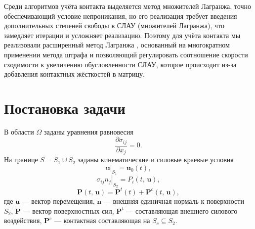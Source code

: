 \documentclass[]{article}
\begin{document}
Среди алгоритмов учёта контакта \cite{Burago2005} выделяется метод множителей Лагранжа, точно обеспечивающий условие непроникания, но его реализация требует введения дополнительных степеней свободы в СЛАУ (множителей Лагранжа), что замедляет итерации и усложняет реализацию. Поэтому для учёта контакта мы реализовали расширенный метод Лагранжа \cite{Wriggers2006}, основанный на многократном применении метода штрафа и позволяющий регулировать соотношение скорости сходимости к увеличению обусловленности СЛАУ, которое происходит из-за добавления контактных жёсткостей в матрицу.

\section{Постановка задачи}
В области $\Omega$ заданы уравнения равновесия \cite{Pisarenko1981}
\begin{equation}
\frac{\partial\sigma_{ij}}{\partial x_j} = 0.%
\label{F:F1}
\end{equation}
На границе $S=S_{1}\cup S_{2}$ заданы кинематические и силовые
краевые условия
\begin{equation}
\left.\mathbf{u}\right|_{S_{1}}=\mathbf{u}_{0}\left(t\right),
\label{F:F2}
\end{equation}
\begin{equation}
\left.\sigma_{ij}n_j\right|_{S_{2}}=P_{i}\left(t,\,\mathbf{u}\right),%
\label{F:F3}
\end{equation}
\begin{equation}
\mathbf{P}\left(t,\,\mathbf{u}\right)=\mathbf{P}^t\left(t\right)+\mathbf{P}^c\left(t,\,\mathbf{u}\right),
\label{F:F_Contact_razlojenie}
\end{equation}
где $\mathbf{u}$ --- вектор перемещения, $\mathbf{n}$ --- внешняя единичная нормаль к поверхности $S_{2}$, $\mathbf{P}$ --- вектор поверхностных сил, $\mathbf{P}^t$ --- составляющая внешнего силового воздействия, $\mathbf{P}^c$ --- контактная составляющая на $S_c\subseteq S_2$.
\end{document}

